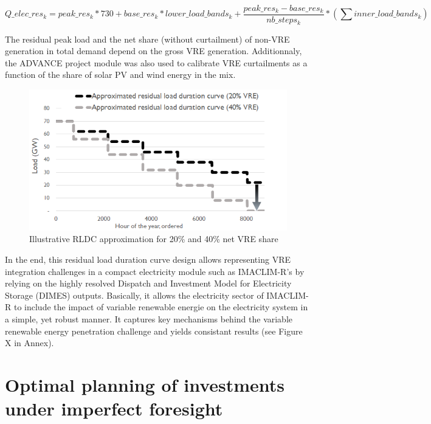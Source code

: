  
\begin{dmath}
        Q\_elec\_res_k =
        {peak\_res_k} * 730 + 
        {base\_res_k} * {lower\_load\_bands_k} +  
        \frac{peak\_res_k - base\_res_k}{nb\_steps_k} * ( \sum inner\_load\_bands_k) 
    \label{eqn:elecQres}
\end{dmath}


 The residual peak load and the net share (without curtailment) of non-VRE generation in total demand depend on the gross VRE generation. Additionnaly, the ADVANCE project module was also used to calibrate VRE curtailments as a function of the share of solar PV and wind energy in the mix. %
\begin{figure}[H]
\includegraphics[scale=0.8]{figures&tables/LDC&RLDC.png}
\centering
\caption{Illustrative RLDC approximation for 20\% and 40\% net VRE share}
\label{fig:RLDCapprox}
\end{figure}

In the end, this residual load duration curve design allows representing VRE integration challenges in a compact electricity module such as IMACLIM-R's by relying on the highly resolved Dispatch and Investment Model for Electricity Storage (DIMES)  outputs. Basically, it allows the electricity sector of IMACLIM-R to include the impact of variable renewable energie on the electricity system in a simple, yet robust manner. It captures key mechanisms behind the variable renewable energy penetration challenge and yields consistant results (see Figure X in Annex).



\section{Optimal planning of investments under imperfect foresight}

